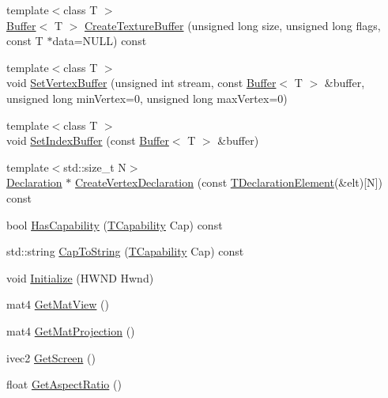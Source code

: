 \begin{DoxyCompactItemize}
\item 
{\footnotesize template$<$class T $>$ }\\\hyperlink{class_agmd_1_1_buffer}{Buffer}$<$ T $>$ \hyperlink{class_agmd_1_1_driver_a30c95b577c73fee812ceb1714c542e1b}{Create\+Texture\+Buffer} (unsigned long size, unsigned long flags, const T $\ast$data=N\+U\+L\+L) const 
\item 
{\footnotesize template$<$class T $>$ }\\void \hyperlink{class_agmd_1_1_driver_a8250e4086394f717b67cb38059a8d3fe}{Set\+Vertex\+Buffer} (unsigned int stream, const \hyperlink{class_agmd_1_1_buffer}{Buffer}$<$ T $>$ \&buffer, unsigned long min\+Vertex=0, unsigned long max\+Vertex=0)
\item 
{\footnotesize template$<$class T $>$ }\\void \hyperlink{class_agmd_1_1_driver_a5dccb83b805c97bc4b50c92999055737}{Set\+Index\+Buffer} (const \hyperlink{class_agmd_1_1_buffer}{Buffer}$<$ T $>$ \&buffer)
\item 
{\footnotesize template$<$std\+::size\+\_\+t N$>$ }\\\hyperlink{class_agmd_1_1_declaration}{Declaration} $\ast$ \hyperlink{class_agmd_1_1_driver_a93266682368c862356b50269041f983f}{Create\+Vertex\+Declaration} (const \hyperlink{struct_agmd_1_1_t_declaration_element}{T\+Declaration\+Element}(\&elt)\mbox{[}N\mbox{]}) const 
\item 
bool \hyperlink{class_agmd_1_1_driver_ac97e6ae7ed4b0e1bfe6905c3ac2642d2}{Has\+Capability} (\hyperlink{namespace_agmd_ac521de717d36bdd8a4aa86150d82a038}{T\+Capability} Cap) const 
\item 
std\+::string \hyperlink{class_agmd_1_1_driver_a2a2572fd9014436acc31978a2f992f8e}{Cap\+To\+String} (\hyperlink{namespace_agmd_ac521de717d36bdd8a4aa86150d82a038}{T\+Capability} Cap) const 
\item 
void \hyperlink{class_agmd_1_1_driver_a59a990194eb3b481b0b76a1a4257981a}{Initialize} (H\+W\+N\+D Hwnd)
\item 
mat4 \hyperlink{class_agmd_1_1_driver_a62c2818bf3bd13156ccd8dba304e05c7}{Get\+Mat\+View} ()
\item 
mat4 \hyperlink{class_agmd_1_1_driver_a0725af382475485e57a9d043d4e16f96}{Get\+Mat\+Projection} ()
\item 
ivec2 \hyperlink{class_agmd_1_1_driver_a94ddb55c49236dc19039b0ff01b6c90e}{Get\+Screen} ()
\item 
float \hyperlink{class_agmd_1_1_driver_a5e2188067d439d7ee62926934a6f7ff5}{Get\+Aspect\+Ratio} ()
\item 

\end{DoxyCompactItemize}
